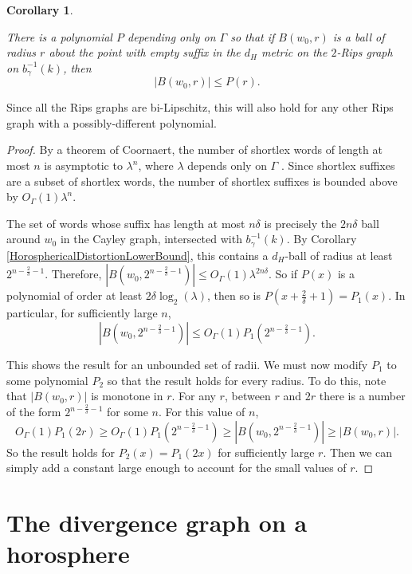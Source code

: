 \documentclass{amsart}
\newtheorem{corollary}[theorem]{Corollary}
\theoremstyle{definition}
\theoremstyle{remark}
\begin{document}
	\begin{corollary} \label{RipsGraphGrowth}
		
		There is a polynomial $P$ depending only on $\Gamma$ so that if $B(w_0, r)$ is a ball of radius $r$ about the point with empty suffix in the $d_H$ metric on the $2$-Rips graph on $b_\gamma^{-1}(k)$, then 
        $$ |B(w_0, r)|\le P(r).$$
		
	\end{corollary}
	
	Since all the Rips graphs are bi-Lipschitz, this will also hold for any other Rips graph with a possibly-different polynomial.
	
	\begin{proof}
		
		By a theorem of Coornaert, the number of shortlex words of length at most $n$ is asymptotic to $\lambda^n$, where $\lambda$ depends only on $\Gamma$ \cite{Coornaert}. Since shortlex suffixes are a subset of shortlex words, the number of shortlex suffixes is bounded above by $O_\Gamma(1)\lambda^n$. 
        
        The set of words whose suffix has length at most $n\delta$ is precisely the $2n\delta$ ball around $w_0$ in the Cayley graph, intersected with $b_\gamma^{-1}(k)$. By Corollary \ref{HorosphericalDistortionLowerBound}, this contains a $d_H$-ball of radius at least $2^{n-\frac{2}{\delta} -1}$. Therefore, $|B(w_0, 2^{n-\frac{2}{\delta}-1})|\le O_\Gamma(1)\lambda^{2n\delta}$. So if $P(x)$ is a polynomial of order at least $2\delta\log_2(\lambda)$, then so is $P(x+\frac{2}{\delta}+1)=P_1(x)$. In particular, for sufficiently large $n$, $$|B(w_0, 2^{n-\frac{2}{\delta}-1})|\le O_\Gamma(1)P_1(2^{n-\frac{2}{\delta}-1}).$$
		
		This shows the result for an unbounded set of radii. We must now modify $P_1$ to some polynomial $P_2$ so that the result holds for every radius. To do this, note that $|B(w_0, r)|$ is monotone in $r$. For any $r$, between $r$ and $2r$ there is a number of the form $2^{n-\frac{2}{\delta}-1}$ for some $n$. For this value of $n$, $$O_\Gamma(1)P_1(2r)\ge O_\Gamma(1)P_1(2^{n-\frac{2}{\delta}-1}) \ge |B(w_0, 2^{n-\frac{2}{\delta}-1})|\ge |B(w_0, r)|.$$ So the result holds for $P_2(x)=P_1(2x)$ for sufficiently large $r$. Then we can simply add a constant large enough to account for the small values of $r$.
		\end{proof}
	
	\section{The divergence graph on a horosphere}
	\label{sec:DivergenceGraph}
\end{document}

